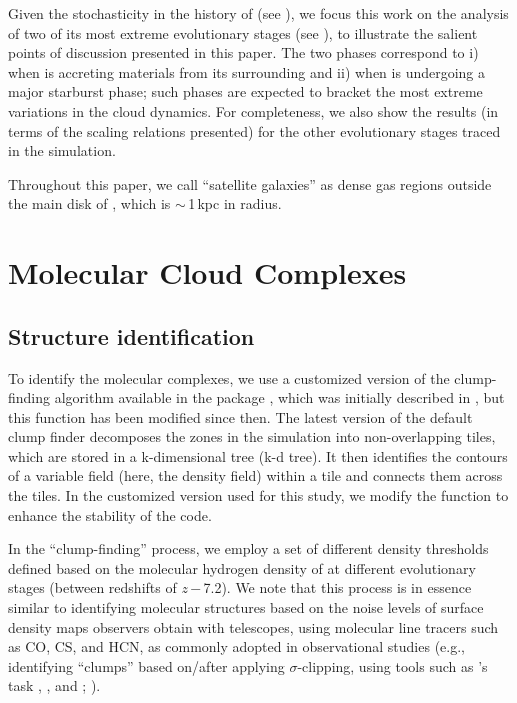 \IfFileExists{emulateapjlegacy.cls}{\documentclass[iop]{emulateapjlegacy}}{\documentclass[iop]{emulateapj}}
\begin{document}
Given the stochasticity in the \SF history of \flower (see ), we focus this work on the analysis of two of its most extreme evolutionary 
stages (see ), to illustrate the salient points of discussion presented in this paper.
The two phases correspond to i) when \flower 
is accreting materials from its surrounding  and ii) when \flower is undergoing a major starburst phase; such phases are expected to bracket the most extreme variations in the cloud dynamics. 
For completeness, we also show the results (in terms of the scaling relations presented) for 
the other evolutionary stages traced in the simulation.

Throughout this paper, we call ``satellite galaxies'' as dense gas regions outside the main disk of \flower,
which is $\sim$\,1\,kpc in radius.

\section{Molecular Cloud Complexes}\label{sec:eqn}

\subsection{Structure identification}\label{sec:method}

To identify the molecular complexes, we use a customized version of the clump-finding algorithm available in the  package  \citep{Turk11a}, which was initially described in \citet{Smith09a}, but this function has been modified since then.
%
The latest version of the default  clump finder decomposes the zones in the simulation into non-overlapping tiles, which are stored in a k-dimensional tree (k-d tree). It then identifies the contours of a variable field (here, the density field) within a tile and connects them across the tiles. In the customized version used for this study, we modify the function to enhance the stability of the code.

In the ``clump-finding'' process, we employ a set of different density thresholds defined based on the molecular hydrogen density of \flower 
at different evolutionary stages (between redshifts of $z$\,$-$\,7.2). We 
note that this process is in essence similar to identifying molecular structures based on the noise levels of surface density maps observers obtain with telescopes, using molecular line tracers such as CO, CS, and HCN, as commonly adopted in observational studies (e.g., identifying ``clumps'' based on/after applying $\sigma$-clipping, using tools such as 's task , , and ; \citealt{Williams94a, Oka01a, Rosolowsky06a, Rosolowsky08a}).
\end{document}
